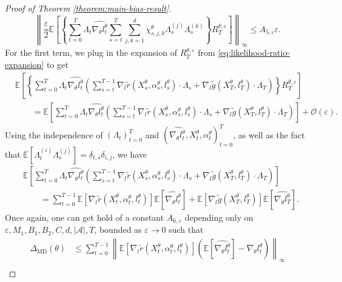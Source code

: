 \documentclass[11pt]{article}
\numberwithin{equation}{section}
\theoremstyle{definition}
\theoremstyle{remark}
\def\eps{\varepsilon}
\def\cA{\mathcal{A}}
\begin{document}
\begin{proof}[Proof of Theorem \ref{theorem:main-bias-result}]
\[
    \left\| \frac{\eps}{2}\mathbb E \left[ \left\{\sum_{t=0}^{T} \Lambda_t \widehat{\nabla_\theta l^\theta_t} \sum_{s=t}^{T}\sum_{j,k=1}^d \chi^\theta_{s,j,k} \Lambda_s^{(j)} \Lambda_s^{(k)} \right\} R_T^{\theta, \eps}\right] \right\|_\infty 
    \leq A_{5,\eps} \eps.
\]
For the first term, we plug in the expansion of $R_T^{\theta, \eps}$ from \eqref{eq:likelihood-ratio-expansion} to get
\[
\begin{aligned}
&\mathbb E \left[ \left\{\sum_{t=0}^{T} \Lambda_t \widehat{\nabla_\theta l^\theta_t} \left(\sum_{s=t}^{T-1}\nabla_l \tilde r(X_s^\theta, \alpha_s^\theta, l_s^\theta) \cdot \Lambda_s 
    + \nabla_l \tilde g(X_T^\theta, l_T^\theta) \cdot \Lambda_T\right)  \right\} R_T^{\theta, \eps}\right] \\
    &\qquad = \mathbb E \left[ \sum_{t=0}^{T} \Lambda_t \widehat{\nabla_\theta l^\theta_t} \left(\sum_{s=t}^{T-1}\nabla_l \tilde r(X_s^\theta, \alpha_s^\theta, l_s^\theta) \cdot \Lambda_s 
    + \nabla_l \tilde g(X_T^\theta, l_T^\theta) \cdot \Lambda_T\right)   \right] + \mathcal O (\eps).
\end{aligned}
\]
Using the independence of $(\Lambda_t)_{t=0}^T$ and $(\widehat{\nabla_\theta l_t^\theta}, X_t^\theta, \alpha_t^\theta)_{t=0}^T$, as well as the fact that $\mathbb E[\Lambda_t^{(i)} \Lambda_s^{(j)}] = \delta_{t,s} \delta_{i,j}$, we have
\[
\begin{aligned}
 &\mathbb E \left[ \sum_{t=0}^{T} \Lambda_t \widehat{\nabla_\theta l^\theta_t} \left(\sum_{s=t}^{T-1}\nabla_l \tilde r(X_s^\theta, \alpha_s^\theta, l_s^\theta) \cdot \Lambda_s 
    + \nabla_l \tilde g(X_T^\theta, l_T^\theta) \cdot \Lambda_T\right)\right] \\
&\qquad = \sum_{t=0}^{T-1} \mathbb E \left[ \nabla_l \tilde r(X_t^\theta, \alpha_t^\theta, l_t^\theta) \right] \mathbb E \left[ \widehat{\nabla_\theta l^\theta_t} \right] 
+ \mathbb E \left[ \nabla_l \tilde g(X_T^\theta, l_T^\theta) \right] \mathbb E \left[ \widehat{\nabla_\theta l^\theta_T} \right].
\end{aligned}
\]
Once again, one can get hold of a constant $A_{6,\eps}$ depending only on $\eps, M_1, B_1, B_2, C, d, | \cA |, T$, bounded as $\eps \to 0$ such that
\[
\begin{aligned}
    \Delta_{\mathrm{MD}}(\theta) &\leq \sum_{t=0}^{T-1}  \left\|\mathbb E \left[ \nabla_l \tilde r(X_t^\theta, \alpha_t^\theta, l_t^\theta) \right] \left(\mathbb E \left[ \widehat{\nabla_\theta l^\theta_t} \right] - \nabla_\theta l_t^\theta\right)\right\|_\infty \\

\end{aligned}\]
\end{proof}
\end{document}
